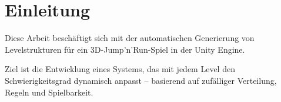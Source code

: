 \section{Einleitung}

Diese Arbeit beschäftigt sich mit der automatischen Generierung von Levelstrukturen
für ein 3D-Jump’n’Run-Spiel in der Unity Engine.

Ziel ist die Entwicklung eines Systems, das mit jedem Level den Schwierigkeitsgrad
dynamisch anpasst – basierend auf zufälliger Verteilung, Regeln und Spielbarkeit.
